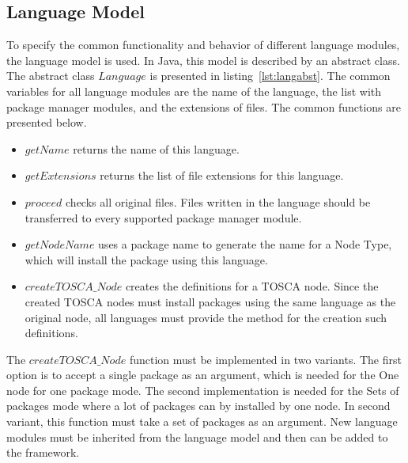 \subsection*{Language Model}
To specify the common functionality and behavior of different language modules, the language model is used. 
In Java, this model is described by an abstract class. 
The abstract class $Language$ is presented in listing~\ref{lst:langabst}.
The common variables for all language modules are the name of the language, the list with package manager modules, and the extensions of files.
The common functions are presented below.
\begin{itemize}
	\item $getName$ returns the name of this language.
	\item $getExtensions$ returns the list of file extensions for this language.
	\item $proceed$ checks all original files.  
	Files written in the language should be transferred to every supported package manager module.
	\item $getNodeName$ uses a package name to generate the name for a Node Type, which will install the package using this language.
	\item $createTOSCA\_Node$ creates the definitions for a TOSCA node. 
	Since the created TOSCA nodes must install packages using the same language as the original node, all languages must provide the method for the creation such definitions.
\end{itemize}
The $createTOSCA\_Node$ function must be implemented in two variants. 
The first option is to accept a single package as an argument, which is needed for the One node for one package mode.
The second implementation is needed for the Sets of packages mode where a lot of packages can by installed by one node.
In second variant, this function must take a set of packages as an argument.
New language modules must be inherited from the language model and then can be added to the framework.

